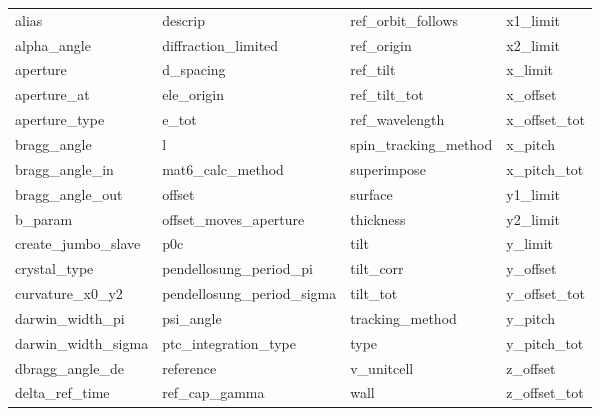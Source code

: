  \begin{tabular}{llll} \toprule
alias                       & descrip                     & ref_orbit_follows           & x1_limit                    \\
alpha_angle                 & diffraction_limited         & ref_origin                  & x2_limit                    \\
aperture                    & d_spacing                   & ref_tilt                    & x_limit                     \\
aperture_at                 & ele_origin                  & ref_tilt_tot                & x_offset                    \\
aperture_type               & e_tot                       & ref_wavelength              & x_offset_tot                \\
bragg_angle                 & l                           & spin_tracking_method        & x_pitch                     \\
bragg_angle_in              & mat6_calc_method            & superimpose                 & x_pitch_tot                 \\
bragg_angle_out             & offset                      & surface                     & y1_limit                    \\
b_param                     & offset_moves_aperture       & thickness                   & y2_limit                    \\
create_jumbo_slave          & p0c                         & tilt                        & y_limit                     \\
crystal_type                & pendellosung_period_pi      & tilt_corr                   & y_offset                    \\
curvature_x0_y2             & pendellosung_period_sigma   & tilt_tot                    & y_offset_tot                \\
darwin_width_pi             & psi_angle                   & tracking_method             & y_pitch                     \\
darwin_width_sigma          & ptc_integration_type        & type                        & y_pitch_tot                 \\
dbragg_angle_de             & reference                   & v_unitcell                  & z_offset                    \\
delta_ref_time              & ref_cap_gamma               & wall                        & z_offset_tot                \\
 \bottomrule
 \end{tabular}
 \vfill
 
